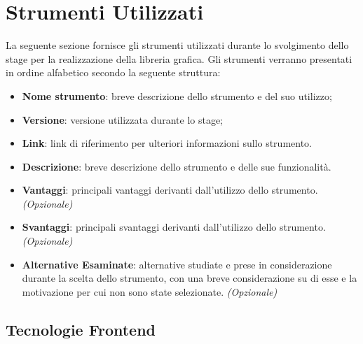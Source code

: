 \section{Strumenti Utilizzati}
La seguente sezione fornisce gli strumenti utilizzati durante lo svolgimento dello stage per la realizzazione della libreria grafica.
Gli strumenti verranno presentati in ordine alfabetico secondo la seguente struttura:
\begin{itemize}
      \item \textbf{Nome strumento}: breve descrizione dello strumento e del suo utilizzo;
      \item \textbf{Versione}: versione utilizzata durante lo stage;
      \item \textbf{Link}: link di riferimento per ulteriori informazioni sullo strumento.
      \item \textbf{Descrizione}: breve descrizione dello strumento e delle sue funzionalità.
      \item \textbf{Vantaggi}: principali vantaggi derivanti dall'utilizzo dello strumento. \textit{(Opzionale)}
      \item \textbf{Svantaggi}: principali svantaggi derivanti dall'utilizzo dello strumento. \textit{(Opzionale)}
      \item \textbf{Alternative Esaminate}: alternative studiate e prese in considerazione durante la scelta dello strumento, con una breve considerazione
            su di esse e la motivazione per cui non sono state selezionate. \textit{(Opzionale)}
\end{itemize}

\subsection{Tecnologie Frontend}

